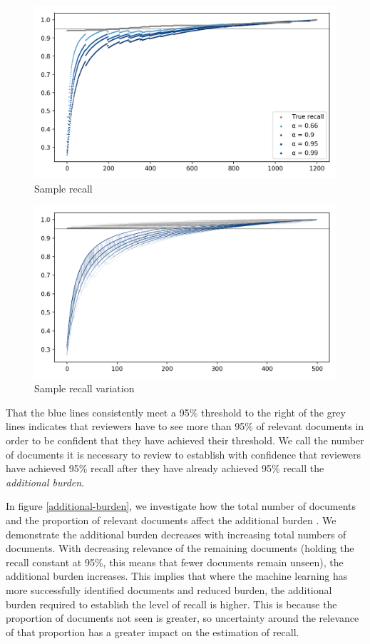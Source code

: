 \documentclass{bmcart}
\begin{document}
	\begin{figure}
		\includegraphics[width=\linewidth]{../images/sample_recall}
		\caption{Sample recall}
		\label{sample-recall}
	\end{figure}	

	\begin{figure}
		\includegraphics[width=\linewidth]{../images/sample_recall_2}
		\caption{Sample recall variation}
		\label{sample-recall-variation}
	\end{figure}	

	That the blue lines consistently meet a 95\% threshold to the right of the grey lines indicates that reviewers have to see more than 95\% of relevant documents in order to be confident that they have achieved their threshold. 
	We call the number of documents it is necessary to review to establish with confidence that reviewers have achieved 95\% recall after they have already achieved 95\% recall the \textit{additional burden}. 
	
	In figure \ref{additional-burden}, we investigate how the total number of documents and the proportion of relevant documents affect the additional burden . We demonstrate the additional burden decreases  with increasing total numbers of documents. With decreasing relevance of the remaining documents (holding the recall constant at 95\%, this means that fewer documents remain unseen), the additional burden increases. This implies that where the machine learning has more successfully identified documents and reduced burden, the additional burden required to establish the level of recall is higher. This is because the proportion of documents not seen is greater, so uncertainty around the relevance of that proportion has a greater impact on the estimation of recall.
		
\end{document}
